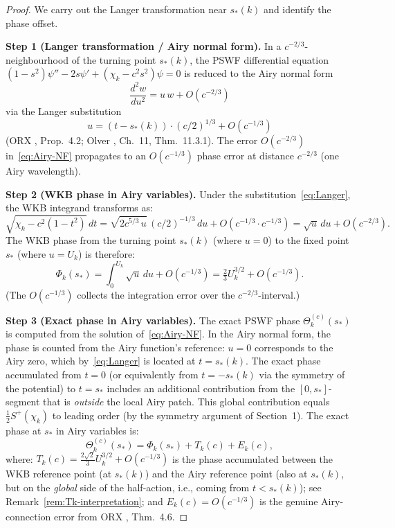 \documentclass[12pt]{amsart}
\begin{document}
\begin{proof}
We carry out the Langer transformation near $s_*(k)$
and identify the phase offset.

\textbf{Step 1 (Langer transformation / Airy normal form).}
In a $c^{-2/3}$-neighbourhood of the turning point $s_*(k)$,
the PSWF differential equation
$(1-s^2)\psi'' - 2s\psi' + (\chi_k - c^2s^2)\psi = 0$
is reduced to the Airy normal form
\begin{equation}\label{eq:Airy-NF}
  \frac{d^2 w}{du^2} = u\,w + O(c^{-2/3})
\end{equation}
via the Langer substitution
\begin{equation}\label{eq:Langer}
  u = (t - s_*(k))\cdot(c/2)^{1/3} + O(c^{-1/3})
\end{equation}
(ORX \cite{OsipovRokhlinXiao}, Prop.~4.2;
Olver \cite{Olver}, Ch.~11, Thm.~11.3.1).
The error $O(c^{-2/3})$ in~\eqref{eq:Airy-NF} propagates
to an $O(c^{-1/3})$ phase error at distance $c^{-2/3}$
(one Airy wavelength).

\textbf{Step 2 (WKB phase in Airy variables).}
Under the substitution~\eqref{eq:Langer},
the WKB integrand transforms as:
\[
  \sqrt{\chi_k - c^2(1-t^2)}\,dt
  = \sqrt{2c^{5/3}\,u}\,(c/2)^{-1/3}\,du + O(c^{-1/3}\cdot c^{-1/3})
  = \sqrt{u}\,du + O(c^{-2/3}).
\]
The WKB phase from the turning point $s_*(k)$ (where $u = 0$)
to the fixed point $s_*$ (where $u = U_k$) is therefore:
\begin{equation}\label{eq:Phi-Airy}
  \Phi_k(s_*)
  = \int_0^{U_k}\sqrt{u}\,du + O(c^{-1/3})
  = \tfrac{2}{3}U_k^{3/2} + O(c^{-1/3}).
\end{equation}
(The $O(c^{-1/3})$ collects the integration error over the
$c^{-2/3}$-interval.)

\textbf{Step 3 (Exact phase in Airy variables).}
The exact PSWF phase $\Theta_k^{(c)}(s_*)$ is computed
from the solution of~\eqref{eq:Airy-NF}.
In the Airy normal form, the phase is counted from the
Airy function's reference: $u = 0$ corresponds to the Airy zero,
which by~\eqref{eq:Langer} is located at $t = s_*(k)$.
The exact phase accumulated from $t = 0$ (or equivalently
from $t = -s_*(k)$ via the symmetry of the potential) to
$t = s_*$ includes an additional contribution from the
$[0, s_*]$-segment that is \emph{outside} the local Airy patch.
This global contribution equals $\frac12 S^+(\chi_k)$
to leading order (by the symmetry argument of Section~1).
The exact phase at $s_*$ in Airy variables is:
\begin{equation}\label{eq:Theta-Airy}
  \Theta_k^{(c)}(s_*)
  = \Phi_k(s_*) + T_k(c) + E_k(c),
\end{equation}
where:
$T_k(c) = \tfrac{2\sqrt{2}}{3}U_k^{3/2} + O(c^{-1/3})$
is the phase accumulated between the WKB reference point
(at $s_*(k)$) and the Airy reference point (also at $s_*(k)$,
but on the \emph{global} side of the half-action, i.e.,
coming from $t < s_*(k)$); see Remark~\ref{rem:Tk-interpretation};
and $E_k(c) = O(c^{-1/3})$ is the genuine Airy-connection
error from ORX \cite{OsipovRokhlinXiao}, Thm.~4.6.


\end{proof}
\end{document}
